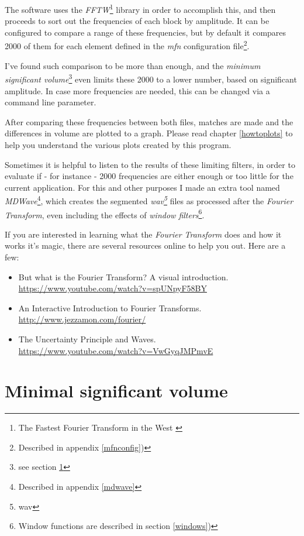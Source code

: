 \documentclass[10pt,a4paper]{report}
\newcommand{\define}[1] {
	\textit{\acrshort{#1}\footnote{\acrlong{#1}}}}
\begin{document}
The software uses the \textit{FFTW}\footnote{The Fastest Fourier Transform in the West \cite{fftw}} library in order to accomplish this, and then proceeds to sort out the frequencies of each block by amplitude. It can be configured to compare a range of these frequencies, but by default it compares 2000 of them for each element defined in the \textit{mfn} configuration file\footnote{Described in appendix \ref{mfnconfig})}.

I've found such comparison to be more than enough, and the \textit{minimum significant volume}\footnote{  see section \ref{MinSigVolume}} even limits these 2000 to a lower number, based on significant amplitude. In case more frequencies are needed, this can be changed via a command line parameter.

After comparing these frequencies between both files, matches are made and the differences in volume are plotted to a graph. Please read chapter \ref{howtoplots} to help you understand the various plots created by this program.

Sometimes it is helpful to listen to the results of these limiting filters, in order to evaluate if - for instance - 2000 frequencies are either enough or too little for the current application. For this and other purposes I made an extra tool named \textit{MDWave}\footnote{Described in appendix \ref{mdwave}}, which creates the segmented \define{wav} files as processed after the \textit{Fourier Transform}, even including the effects of \textit{window filters}\footnote{Window functions are described in section \ref{windows})}.

If you are interested in learning what the \textit{Fourier Transform} does and how it works it's magic, there are several resources online to help you out. Here are a few:

\begin{itemize}
	\item But what is the Fourier Transform? A visual introduction.\\ \url{https://www.youtube.com/watch?v=spUNpyF58BY}
	\item An Interactive Introduction to Fourier Transforms.\\ \url{http://www.jezzamon.com/fourier/}
	\item The Uncertainty Principle and Waves.\\
	\url{https://www.youtube.com/watch?v=VwGyqJMPmvE}
\end{itemize}

\section{Minimal significant volume}
\label{MinSigVolume}
\end{document}

